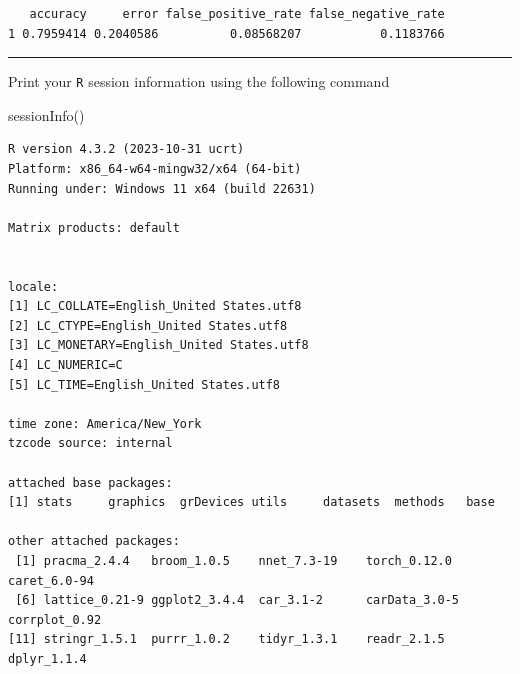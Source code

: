 \documentclass[
  letterpaper,
  DIV=11,
  numbers=noendperiod]{scrartcl}
\newenvironment{Shaded}{\begin{snugshade}}{\end{snugshade}}
\newcommand{\FunctionTok}[1]{\textcolor[rgb]{0.28,0.35,0.67}{#1}}
\newcommand{\NormalTok}[1]{\textcolor[rgb]{0.00,0.23,0.31}{#1}}
\begin{document}
\begin{verbatim}
   accuracy     error false_positive_rate false_negative_rate
1 0.7959414 0.2040586          0.08568207           0.1183766
\end{verbatim}

\pagebreak

\begin{center}\rule{0.5\linewidth}{0.5pt}\end{center}

\begin{tcolorbox}[enhanced jigsaw, breakable, opacitybacktitle=0.6, colbacktitle=quarto-callout-note-color!10!white, colframe=quarto-callout-note-color-frame, rightrule=.15mm, toptitle=1mm, left=2mm, titlerule=0mm, coltitle=black, opacityback=0, leftrule=.75mm, bottomtitle=1mm, arc=.35mm, toprule=.15mm, bottomrule=.15mm, title=\textcolor{quarto-callout-note-color}{\faInfo}\hspace{0.5em}{Session Information}, colback=white]

Print your \texttt{R} session information using the following command

\begin{Shaded}
\begin{Highlighting}[]
\FunctionTok{sessionInfo}\NormalTok{()}
\end{Highlighting}
\end{Shaded}

\begin{verbatim}
R version 4.3.2 (2023-10-31 ucrt)
Platform: x86_64-w64-mingw32/x64 (64-bit)
Running under: Windows 11 x64 (build 22631)

Matrix products: default


locale:
[1] LC_COLLATE=English_United States.utf8 
[2] LC_CTYPE=English_United States.utf8   
[3] LC_MONETARY=English_United States.utf8
[4] LC_NUMERIC=C                          
[5] LC_TIME=English_United States.utf8    

time zone: America/New_York
tzcode source: internal

attached base packages:
[1] stats     graphics  grDevices utils     datasets  methods   base     

other attached packages:
 [1] pracma_2.4.4   broom_1.0.5    nnet_7.3-19    torch_0.12.0   caret_6.0-94  
 [6] lattice_0.21-9 ggplot2_3.4.4  car_3.1-2      carData_3.0-5  corrplot_0.92 
[11] stringr_1.5.1  purrr_1.0.2    tidyr_1.3.1    readr_2.1.5    dplyr_1.1.4   


\end{verbatim}
\end{tcolorbox}
\end{document}
